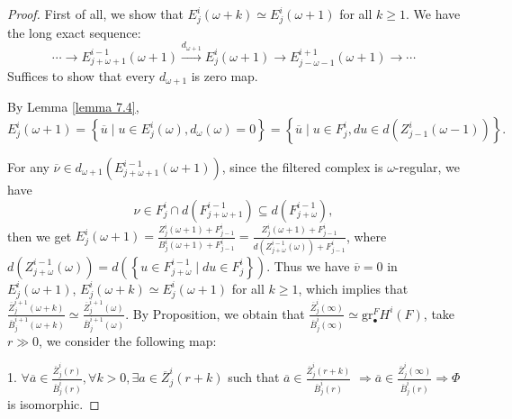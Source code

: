 \documentclass[openany]{book}
\theoremstyle{definition} %
\theoremstyle{remark}
\begin{document}
\begin{proof}
    First of all, we show that $E^{i}_{j}(\omega+k)\simeq E^{i}_{j}(\omega+1)$ for all $k\ge 1$.
    We have the long exact sequence:$$ \cdots \rightarrow E_{j+\omega+1}^{i-1}(\omega+1) \xrightarrow{d_{\omega+1}} E_j^i(\omega+1) \longrightarrow E_{j-\omega-1}^{i+1}(\omega+1) \rightarrow \cdots $$Suffices to show that every $d_{\omega+1}$ is zero map.

    By Lemma \ref{lemma 7.4}, $E_j^i(\omega+1) = \left\{ \overline{u} \mid u \in E_j^i(\omega), d_\omega(\omega) = 0 \right\} = \left\{ \overline{u} \mid u \in F_j^i, du \in d\left(Z_{j-1}^i(\omega-1)\right) \right\}.$

    For any $\overline{\nu} \in d_{\omega+1}\left(E_{j+\omega+1}^{i-1}(\omega+1)\right)$, since the filtered complex is $\omega$-regular, we have $$ \nu \in F_j^i \cap d(F^{i-1}_{j+\omega+1}) \subseteq d(F_{j+\omega}^{i-1}), $$ then we get $E_j^i(\omega+1) = \frac{Z_j^i(\omega+1) + F_{j-1}^i}{B_j^i(\omega+1) + F_{j-1}^i} = \frac{Z_j^i(\omega+1) + F_{j-1}^i}{d\left(Z_{j+\omega}^{i-1}(\omega)\right) + F_{j-1}^i}$, where $d\left(Z_{j+\omega}^{i-1}(\omega)\right)=d\left( \left\{ u \in F_{j+\omega}^{i-1} \mid du \in F_j^i \right\} \right)$.
    Thus we have $\overline{v}=0$ in $E^{i}_{j}(\omega+1)$, $E^{i}_{j}(\omega+k)\simeq E^{i}_{j}(\omega+1)$ for all $k\ge 1$, which implies that $\frac{\overline{Z}^{i+1}_{j}(\omega+k)}{\overline{B}^{i+1}_{j}(\omega+k)}\simeq\frac{\overline{Z}^{i+1}_{j}(\omega)}{\overline{B}^{i+1}_{j}(\omega)}$.
    By Proposition, we obtain that $\frac{\overline{Z}^{i}_{j}(\infty)}{\overline{B}^{i}_{j}(\infty)}\simeq \mathrm{gr}_{\bullet}^{F}H^{i}(F)$, take $r\gg 0$, we consider the following map:
    \begin{center}

    \end{center}

    1. $\forall \overline{a} \in \frac{\overline{Z}_j^i(r)}{\overline{B}_j^i(r)}, \forall k > 0, \exists a \in \overline{Z}_j^i(r+k)$ such that $\overline{a} \in \frac{\overline{Z}_j^i(r+k)}{\overline{B}_j^i(r)}$ $\Rightarrow \overline{a} \in \frac{\overline{Z}_j^i(\infty)}{\overline{B}_j^i(r)} \Rightarrow \Phi$ is isomorphic.


\end{proof}
\end{document}
